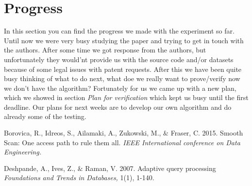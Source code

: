 \documentclass[a4paper,11pt,titlepage]{article}
\begin{document}
\section{Progress}
In this section you can find the progress we made with the experiment so far. Until now we were very busy studying the paper and trying to get in touch with the authors. After some time we got response from the authors, but unfortunately they would'nt provide us with the source code and/or datasets because of some legal issues with patent requests. After this we have been quite busy thinking of what to do next, what doe we really want to prove/verify now we don't have the algorithm? Fortunately for us we came up with a new plan, which we showed in section \emph{Plan for verification} which kept us busy until the first deadline. Our plans for next weeks are to develop our own algorithm and do already some of the testing.

\begin{thebibliography}{9}

	 Borovica, R., Idreos, S., Ailamaki, A., Zukowski, M., $\&$ Fraser, C.
	2015.	
 	Smooth Scan: One access path to rule them all.
	\emph{IEEE International conference on Data Engineering.}

	Deshpande, A., Ives, Z., $\&$ Raman, V.
	2007.
	Adaptive query processing
	\emph{Foundations and Trends in Databases,}
	1(1), 1-140.
\end{thebibliography}
\end{document}
